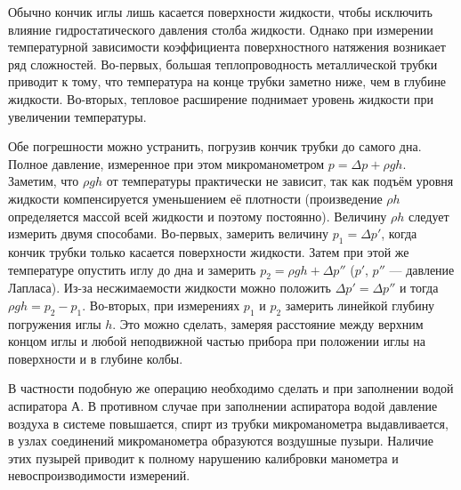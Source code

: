 Обычно кончик иглы лишь касается поверхности жидкости, чтобы исключить влияние гидростатического давления столба жидкости. Однако при измерении температурной зависимости коэффициента поверхностного натяжения возникает ряд сложностей. Во-первых, большая теплопроводность металлической трубки приводит к тому, что температура на конце трубки заметно ниже, чем в глубине жидкости. Во-вторых, тепловое расширение поднимает уровень жидкости при увеличении температуры. 

Обе погрешности можно устранить, погрузив кончик трубки до самого дна. Полное давление, измеренное при этом микроманометром
$p=\Delta p + \rho gh$. Заметим, что $\rho gh$ от температуры практически не зависит, так как подъём уровня жидкости компенсируется уменьшением её плотности (произведение $\rho h$ определяется массой всей жидкости и поэтому постоянно).
Величину $\rho h$ следует измерить двумя способами. Во-первых, замерить величину $p_1 = \Delta p'$,
когда кончик трубки только касается поверхности жидкости. Затем при этой же температуре опустить иглу до дна и замерить
$p_2 = \rho gh + \Delta p''$ ($p'$, $p''$ --- давление Лапласа).
Из-за  несжимаемости  жидкости можно положить $\Delta p' = \Delta p''$ и тогда
$\rho gh = p_2 - p_1$. Во-вторых, при измерениях $p_1$ и $p_2$ замерить линейкой  глубину погружения иглы $h$.
Это можно сделать, замеряя расстояние между верхним концом иглы и любой неподвижной частью прибора при положении иглы на поверхности и в глубине колбы.

В частности подобную же операцию необходимо сделать и при заполнении водой аспиратора А. В противном случае при заполнении аспиратора водой давление воздуха в системе повышается, спирт из трубки микроманометра выдавливается, в узлах соединений микроманометра образуются воздушные пузыри. Наличие этих пузырей приводит к полному нарушению калибровки манометра и невоспроизводимости измерений.
